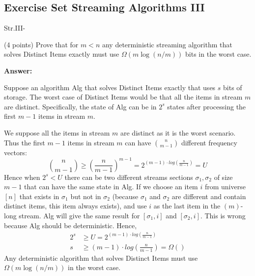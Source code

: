 \documentclass{article}
\newcommand{\distinctItems}{{\sc Distinct Items}\xspace}
\renewcommand{\geq}{\geqslant}
\newcommand{\alg}{{\sc Alg}\xspace}
\newcounter{rcounter}
\newenvironment{rlist}%
{\begin{list}{\setnr-\arabic{rcounter}}{\usecounter{rcounter}}}{\end{list}}
\begin{document}
    
    \renewcommand{\setnr}{Str.III}
    \subsection*{Exercise Set Streaming Algorithms III}
    
    \begin{rlist}
        
        \item (4 points)
        Prove that for $m<n$ any deterministic streaming algorithm that solves \distinctItems exactly must use $\Omega(m\log(n/m))$ bits in the worst case.
        
        \textbf{Answer:}
        
        Suppose an algorithm \alg that solves \distinctItems exactly that uses $s$ bits of storage. The worst case of \distinctItems would be that all the items in stream $m$ are distinct. Specifically, the state of \alg can be in $2^s$ states after processing the first $m-1$ items in stream $m$.
        
        We suppose all the items in stream $m$ are distinct as it is the worst scenario. Thus the first $m-1$ items in stream $m$ can have $\binom{n}{m-1}$ different frequency vectors:
        \begin{equation*}
        \binom{n}{m-1} \geq (\frac{n}{m-1})^{m-1} = 2^{(m-1) \cdot log(\frac{n}{m-1})} = U
        \end{equation*}
        Hence when $2^s<U$ there can be two different streams sections $\sigma_1, \sigma_2$ of size $m-1$ that can have the same state in \alg. 
        If we choose an item $i$ from universe $[n]$ that exists in $\sigma_1$ but not in $\sigma_2$ (because $\sigma_1$ and $\sigma_2$ are different and contain distinct items, this item always exists), and use $i$ as the last item in the $(m)$-long stream. \alg will give the same result for $[\sigma_1, i]$ and $[\sigma_2, i]$. This is wrong because \alg should be deterministic. Hence,
        \begin{align*}
        2^s &\geq U = 2^{(m-1) \cdot log(\frac{n}{m-1})} \\
        s &\geq (m-1) \cdot log(\frac{n}{m-1}) = \Omega()
        \end{align*}
        Any deterministic algorithm that solves \distinctItems must use $\Omega(m\log(n/m))$ in the worst case.
        

\end{rlist}
\end{document}
